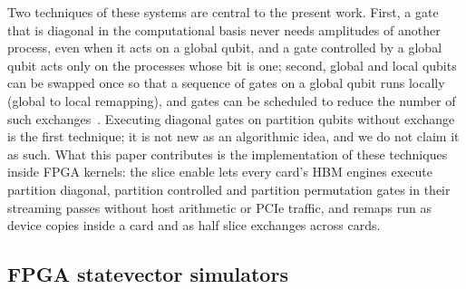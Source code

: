 Two techniques of these systems are central to the present work. First, a gate that is diagonal in the computational
basis never needs amplitudes of another process, even when it acts on a global qubit, and a gate controlled by a
global qubit acts only on the processes whose bit is one; second, global and local qubits can be swapped once so that
a sequence of gates on a global qubit runs locally (global to local remapping), and gates can be scheduled to reduce
the number of such exchanges~\cite{haner2017petabyte}. Executing diagonal gates on partition qubits without exchange is the
first technique; it is not new as an algorithmic idea, and we do not claim it as such. What this paper contributes is the
implementation of these techniques inside FPGA kernels: the slice enable lets every card's HBM engines execute
partition diagonal, partition controlled and partition permutation gates in their streaming passes without host
arithmetic or PCIe traffic, and remaps run as device copies inside a card and as half slice exchanges across cards.

\subsection{FPGA statevector simulators}\label{subsec:related-fpga}

